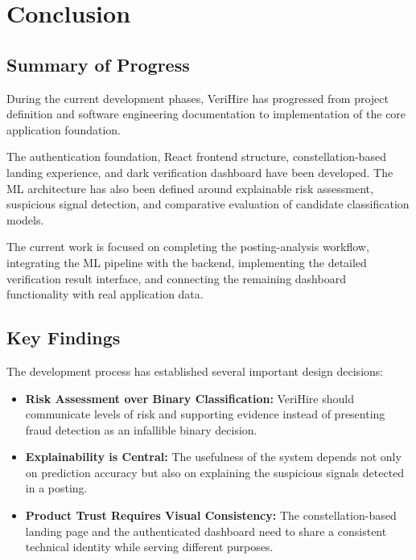 \documentclass[12pt,a4paper]{report}
\begin{document}
\chapter{Conclusion}

\section{Summary of Progress}

During the current development phases, VeriHire has progressed from project definition and software engineering documentation to implementation of the core application foundation.

The authentication foundation, React frontend structure, constellation-based landing experience, and dark verification dashboard have been developed. The ML architecture has also been defined around explainable risk assessment, suspicious signal detection, and comparative evaluation of candidate classification models.

The current work is focused on completing the posting-analysis workflow, integrating the ML pipeline with the backend, implementing the detailed verification result interface, and connecting the remaining dashboard functionality with real application data.


\section{Key Findings}

The development process has established several important design decisions:

\begin{itemize}

    \item \textbf{Risk Assessment over Binary Classification:}
    VeriHire should communicate levels of risk and supporting evidence instead of presenting fraud detection as an infallible binary decision.

    \item \textbf{Explainability is Central:}
    The usefulness of the system depends not only on prediction accuracy but also on explaining the suspicious signals detected in a posting.

    \item \textbf{Product Trust Requires Visual Consistency:}
    The constellation-based landing page and the authenticated dashboard need to share a consistent technical identity while serving different purposes.

\end{itemize}
\end{document}
